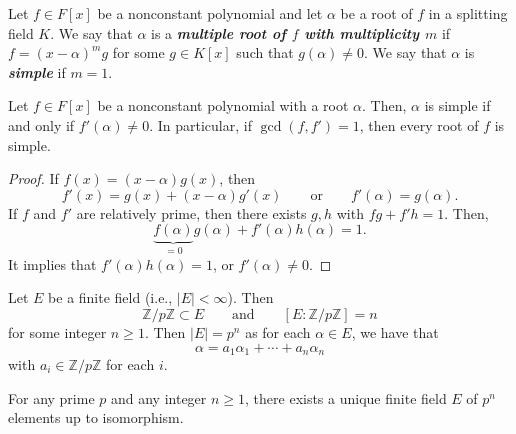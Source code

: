 \documentclass[twoside]{article}
\newcommand\Z{\mathbb Z}
\theoremstyle{remark}
\newcounter{theorem}
\newcommand*\term[1]{\textbf{\textit{\mathversion{bold}#1}}}
\begin{document}
\begin{definition}
  Let \(f \in F[x]\) be a nonconstant polynomial and let \(\alpha\) be a root of \(f\) in a splitting field \(K\). We say that \(\alpha\) is a \term{multiple root of \(f\) with multiplicity \(m\)} if \(f = (x-\alpha)^m g\) for some \(g \in K[x]\) such that \(g(\alpha) \neq 0\). We say that \(\alpha\) is \term{simple} if \(m = 1\).
\end{definition}

\begin{lemma}
  Let \(f \in F[x]\) be a nonconstant polynomial with a root \(\alpha\). Then, \(\alpha\) is simple if and only if \(f'(\alpha) \neq 0\). In particular, if \(\gcd(f,f') = 1\), then every root of \(f\) is simple.
\end{lemma}

\begin{proof}
  If \(f(x) = (x-\alpha) g(x)\), then
  \[ f'(x) = g(x) + (x-\alpha) g'(x) \qquad \text{or} \qquad f'(\alpha) = g(\alpha). \]
  If \(f\) and \(f'\) are relatively prime, then there exists \(g,h\) with \(fg + f'h = 1\). Then,
  \[ \underbrace{f(\alpha)}_{=0} g(\alpha) + f'(\alpha) h(\alpha) = 1. \]
  It implies that \(f'(\alpha) h(\alpha) = 1\), or \(f'(\alpha) \neq 0\).
\end{proof}

Let \(E\) be a finite field (i.e., \(|E| < \infty\)). Then
\[ \Z/p\Z \subset E \qquad \text{and} \qquad [E:\Z/p\Z] = n \]
for some integer \(n \geq 1\). Then \(|E| = p^n\) as for each \(\alpha \in E\), we have that
\[ \alpha = a_1\alpha_1 + \cdots + a_n\alpha_n \]
with \(a_i \in \Z/p\Z\) for each \(i\).

\begin{theorem}
  For any prime \(p\) and any integer \(n \geq 1\), there exists a unique finite field \(E\) of \(p^n\) elements up to isomorphism.
\end{theorem}
\end{document}
